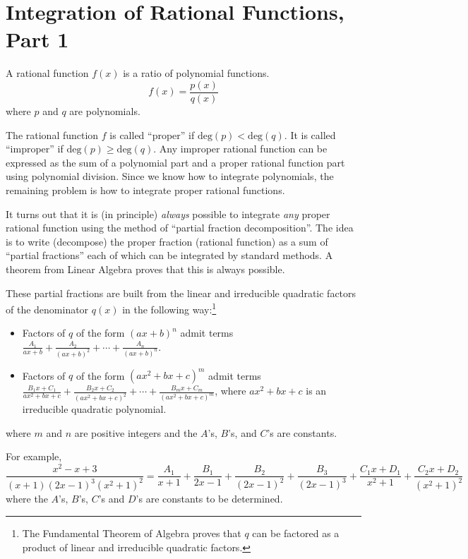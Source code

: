 \documentclass[12pt,letterpaper,fleqn]{article}
\theoremstyle{definition}
\begin{document}
\section*{Integration of Rational Functions, Part 1}
  A rational function $f(x)$ is a ratio of polynomial functions.
\begin{equation*}
  f(x) = \frac{p(x)}{q(x)}
\end{equation*}
where $p$ and $q$ are polynomials.

The rational function $f$ is called ``proper'' if $\text{deg}(p) < \text{deg}(q)$. It is called ``improper'' if $\text{deg}(p) \geq \text{deg}(q)$. Any improper rational function can be expressed as the sum of a polynomial part and a proper rational function part using polynomial division. Since we know how to integrate polynomials, the remaining problem is how to integrate proper rational functions.

It turns out that it is (in principle) \emph{always} possible to integrate \emph{any} proper rational function using the method of ``partial fraction decomposition''. The idea is to write (decompose) the proper fraction (rational function) as a sum of ``partial fractions'' each of which can be integrated by standard methods. A theorem from Linear Algebra proves that this is always possible.

These partial fractions are built from the linear and irreducible quadratic factors of the denominator $q(x)$ in the following way:\footnote{ The Fundamental Theorem of Algebra proves that $q$ can be factored as a product of linear and irreducible quadratic factors.}
\begin{itemize}
  \item Factors of $q$ of the form $(ax + b)^n$ admit terms $\frac{A_1}{ax + b} + \frac{A_2}{(ax + b)^2} + \cdots + \frac{A_n}{(ax + b)^n}$.
  \item Factors of $q$ of the form $(ax^2 + bx + c)^m$ admit terms $\frac{B_1x + C_1}{ax^2 + bx + c} + \frac{B_2x + C_2}{(ax^2 + bx + c)^2} + \cdots + \frac{B_mx + C_m}{(ax^2 + bx + c)^m}$, where $ax^2 + bx + c$ is an irreducible quadratic polynomial.
\end{itemize}
where $m$ and $n$ are positive integers and the $A$'s, $B$'s, and $C$'s are constants.

For example,
\begin{equation*}
  \frac{x^2 - x + 3}{(x+1)(2x-1)^3(x^2+1)^2} = \frac{A_1}{x+1} + \frac{B_1}{2x-1} + \frac{B_2}{(2x-1)^2} + \frac{B_3}{(2x-1)^3} + \frac{C_1x+D_1}{x^2+1} + \frac{C_2x+D_2}{(x^2+1)^2}
\end{equation*}
where the $A$'s, $B$'s, $C$'s and $D$'s are constants to be determined.
\newpage
\end{document}

